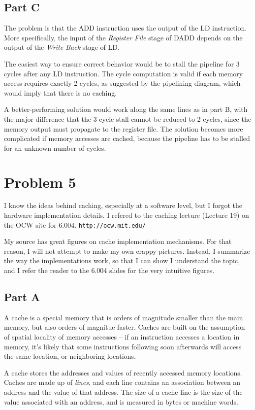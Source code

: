 \subsection{Part C}
The problem is that the ADD instruction uses the output of the LD instruction.
More specifically, the input of the {\it Register File} stage of DADD depends
on the output of the {\it Write Back} stage of LD. 

The easiest way to ensure correct behavior would be to stall the pipeline for 3
cycles after any LD instruction. The cycle computation is valid if each memory
access requires exactly 2 cycles, as suggested by the pipelining diagram, which
would imply that there is no caching.

A better-performing solution would work along the same lines as in part B, with
the major difference that the 3 cycle stall cannot be reduced to 2 cycles,
since the memory output must propagate to the register file. The solution
becomes more complicated if memory accesses are cached, because the pipeline
has to be stalled for an unknown number of cycles.

\section{Problem 5}
I know the ideas behind caching, especially at a software level, but I forgot
the hardware implementation details. I refered to the caching lecture (Lecture
19) on the OCW site for 6.004. {\tt http://ocw.mit.edu/}

My source has great figures on cache implementation mechanisms. For that
reason, I will not attempt to make my own crappy pictures. Instead, I summarize
the way the implementations work, so that I can show I understand the topic,
and I refer the reader to the 6.004 slides for the very intuitive figures.

\subsection{Part A}
A cache is a special memory that is orders of magnitude smaller than the main
memory, but also orders of magnitue faster. Caches are built on the assumption
of spatial locality of memory accesses -- if an instruction accesses a location
in memory, it's likely that some instructions following soon afterwards will
access the same location, or neighboring locations.

A cache stores the addresses and values of recently accessed memory locations.
Caches are made up of {\it lines}, and each line contains an association
between an address and the value of that address. The size of a cache line is
the size of the value associated with an address, and is measured in bytes or
machine words.

